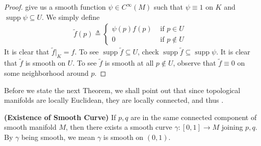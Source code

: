 \documentclass{report}
\begin{document}
\begin{proof}
 give us a smooth function $\psi \in C^{\infty}(M)$ such that $\psi \equiv 1$ on $K$ and  $\operatorname{supp}\psi \subseteq U$. We simply define 
\begin{align*}
\tilde{f}(p)\triangleq \begin{cases}
  \psi(p) f (p)& \text{ if $p\in  U$ }\\
  0& \text{ if $p\not\in U$ }
\end{cases} 
\end{align*}
It is clear that $\tilde{f}|_K=f$. To see $\operatorname{supp}\tilde{f} \subseteq U$, check $\operatorname{supp}\tilde{f} \subseteq \operatorname{supp}\psi$. It is clear that $\tilde{f}$ is smooth on $U$. To see $\tilde{f}$ is smooth at all $p\not\in U$, observe that $\tilde{f}\equiv 0$ on some neighborhood around $p$. 
\end{proof}
\begin{mdframed}
Before we state the next Theorem, we shall point out that since topological manifolds are locally Euclidean, they are locally connected, and thus .  
\end{mdframed}
\begin{theorem}
\textbf{(Existence of Smooth Curve)} If $p,q$ are in the same connected component of smooth manifold $M$, then there exists a smooth curve $\gamma :[0,1]\rightarrow M$ joining $p,q$. By $\gamma $ being smooth, we mean $\gamma $ is smooth on $(0,1)$. 
\end{theorem}
\end{document}
